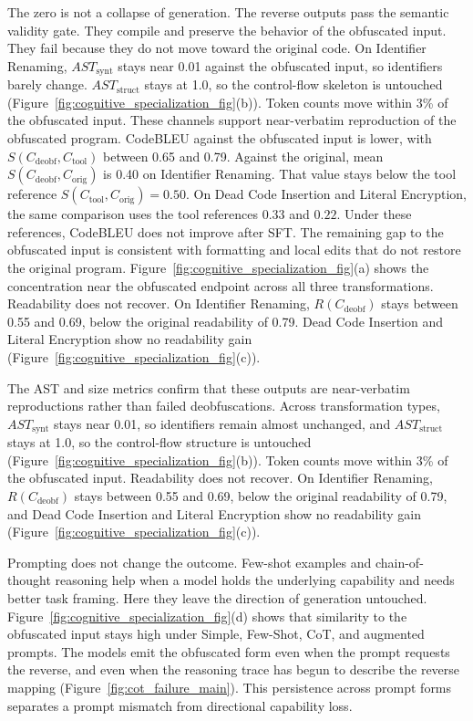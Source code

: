 The zero is not a collapse of generation. The reverse outputs pass the semantic
validity gate. They compile and preserve the behavior of the obfuscated input.
They fail because they do not move toward the original code.
On Identifier Renaming, $AST_{\text{synt}}$ stays near 0.01 against the
obfuscated input, so identifiers barely change.
$AST_{\text{struct}}$ stays at 1.0, so the control-flow skeleton is untouched
(Figure~\ref{fig:cognitive_specialization_fig}(b)).
Token counts move within 3\% of the obfuscated input.
These channels support near-verbatim reproduction of the obfuscated program.
CodeBLEU against the obfuscated input is lower, with
$S(C_{\text{deobf}},C_{\text{tool}})$ between 0.65 and 0.79.
Against the original, mean $S(C_{\text{deobf}},C_{\text{orig}})$ is 0.40 on
Identifier Renaming.
That value stays below the tool reference
$S(C_{\text{tool}},C_{\text{orig}})=0.50$.
On Dead Code Insertion and Literal Encryption, the same comparison uses the
tool references $0.33$ and $0.22$.
Under these references, CodeBLEU does not improve after SFT.
The remaining gap to the obfuscated input is consistent with formatting and
local edits that do not restore the original program.
Figure~\ref{fig:cognitive_specialization_fig}(a) shows the concentration near
the obfuscated endpoint across all three transformations.
Readability does not recover.
On Identifier Renaming, $R(C_{\text{deobf}})$ stays between 0.55 and 0.69,
below the original readability of 0.79.
Dead Code Insertion and Literal Encryption show no readability gain
(Figure~\ref{fig:cognitive_specialization_fig}(c)).

The AST and size metrics confirm that these outputs are near-verbatim
reproductions rather than failed deobfuscations. Across transformation types,
$AST_{\text{synt}}$ stays near 0.01, so identifiers remain almost unchanged,
and $AST_{\text{struct}}$ stays at 1.0, so the control-flow structure is
untouched (Figure~\ref{fig:cognitive_specialization_fig}(b)). Token counts move
within 3\% of the obfuscated input. Readability does not recover. On Identifier
Renaming, $R(C_{\text{deobf}})$ stays between 0.55 and 0.69, below the original
readability of 0.79, and Dead Code Insertion and Literal Encryption show no
readability gain (Figure~\ref{fig:cognitive_specialization_fig}(c)).

Prompting does not change the outcome. Few-shot examples and chain-of-thought
reasoning help when a model holds the underlying capability and needs better task
framing. Here they leave the direction of generation untouched.
Figure~\ref{fig:cognitive_specialization_fig}(d) shows that similarity to the
obfuscated input stays high under Simple, Few-Shot, CoT, and augmented prompts.
The models emit the obfuscated form even when the prompt requests the reverse,
and even when the reasoning trace has begun to describe the reverse mapping
(Figure~\ref{fig:cot_failure_main}). This persistence across prompt forms
separates a prompt mismatch from directional capability loss.

